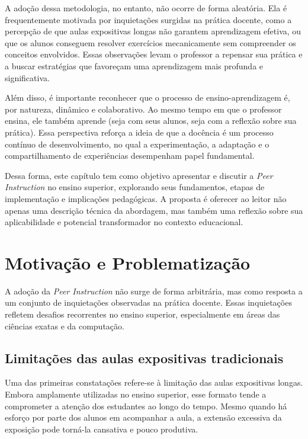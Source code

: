 A adoção dessa metodologia, no entanto, não ocorre de forma aleatória. Ela é frequentemente motivada por inquietações surgidas na prática docente, como a percepção de que aulas expositivas longas não garantem aprendizagem efetiva, ou que os alunos conseguem resolver exercícios mecanicamente sem compreender os conceitos envolvidos. Essas observações levam o professor a repensar sua prática e a buscar estratégias que favoreçam uma aprendizagem mais profunda e significativa.

Além disso, é importante reconhecer que o processo de ensino-aprendizagem é, por natureza, dinâmico e colaborativo. Ao mesmo tempo em que o professor ensina, ele também aprende (seja com seus alunos, seja com a reflexão sobre sua prática). Essa perspectiva reforça a ideia de que a docência é um processo contínuo de desenvolvimento, no qual a experimentação, a adaptação e o compartilhamento de experiências desempenham papel fundamental.

Dessa forma, este capítulo tem como objetivo apresentar e discutir a {\it Peer Instruction} no ensino superior, explorando seus fundamentos, etapas de implementação e implicações pedagógicas. A proposta é oferecer ao leitor não apenas uma descrição técnica da abordagem, mas também uma reflexão sobre sua aplicabilidade e potencial transformador no contexto educacional.

\section{Motivação e Problematização}

A adoção da \textit{Peer Instruction} não surge de forma arbitrária, mas como resposta a um conjunto de inquietações observadas na prática docente. Essas inquietações refletem desafios recorrentes no ensino superior, especialmente em áreas das ciências exatas e da computação.

\subsection{Limitações das aulas expositivas tradicionais}

Uma das primeiras constatações refere-se à limitação das aulas expositivas longas. Embora amplamente utilizadas no ensino superior, esse formato tende a comprometer a atenção dos estudantes ao longo do tempo. Mesmo quando há esforço por parte dos alunos em acompanhar a aula, a extensão excessiva da exposição pode torná-la cansativa e pouco produtiva.


